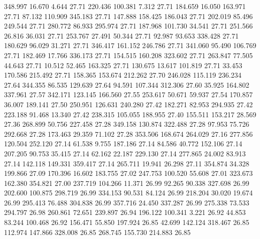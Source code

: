  348.997   16.670    4.644        27.71
 220.436  100.381    7.312        27.71
 184.659   16.050  163.971        27.71
  87.132  110.909  345.183        27.71
 147.888  158.425  186.043        27.71
 202.019   85.496  249.544        27.71
 280.772   86.933  295.974        27.71
 187.968  101.730   34.541        27.71
 251.566   26.816   36.031        27.71
 253.767   27.491   50.344        27.71
  92.987   93.653  338.428        27.71
 180.629   96.029   31.271        27.71
 346.417  161.152  246.786        27.71
 341.060   95.490  106.769        27.71
 182.469   17.766  336.173        27.71
 154.515  160.208  323.602        27.71
 263.847   77.505   44.643        27.71
  10.512   52.465  163.325        27.71
 130.675   13.617  101.819        27.71
  33.453  170.586  215.492        27.71
 158.365  153.674  212.262        27.70
 246.028  115.119  236.234        27.64
 344.355   86.535  129.639        27.64
  94.591  107.344  312.306        27.60
  35.925  164.802  337.961        27.57
 342.171  123.145  166.560        27.55
 253.617   50.671   59.937        27.54
 170.857   36.007  189.141        27.50
 250.951  126.631  240.280        27.42
 182.271   82.953  294.935        27.42
 223.188   91.468   13.340        27.42
 238.315  105.055  188.955        27.40
 155.511  153.217   28.569        27.36
 268.899   50.756  227.458        27.28
 349.158  130.874  322.488        27.28
  97.953   75.726  292.668        27.28
 173.463   29.359   71.102        27.28
 353.506  168.674  264.029        27.16
 277.856  120.504  252.120        27.14
  61.538    9.755  187.186        27.14
  84.586   40.772  152.106        27.14
 207.205   90.753   35.415        27.14
  62.162   22.187  229.130        27.14
 277.865   24.002   83.913        27.14
 142.118  149.331  359.417        27.14
 265.711   19.941   26.298        27.11
 354.874   34.328  199.866        27.09
 170.396   16.602  183.755        27.02
 247.753  100.520   55.608        27.01
 323.673  162.380  354.821        27.00
 237.719  104.266   11.371        26.99
  92.265   90.338  327.698        26.99
 202.600  100.875  298.719        26.99
 334.153   90.531   84.124        26.99
 218.204   30.020   19.674        26.99
 295.413   76.488  304.838        26.99
 357.716   24.450  337.287        26.99
 275.338   73.533  294.797        26.98
 260.861   72.651  239.897        26.94
 196.122  100.341    3.221        26.92
  44.853   83.244  100.468        26.92
 156.471   55.850  197.924        26.85
  42.699  142.124  318.467        26.85
 112.974  147.866  328.008        26.85
 268.745  155.730  214.883        26.85
